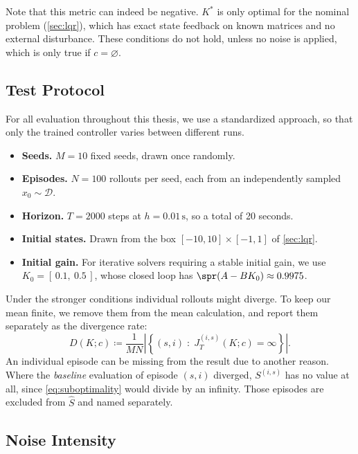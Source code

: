 Note that this metric can indeed be negative. $K^{*}$ is only optimal for
the nominal problem (\cref{sec:lqr}), which has exact state feedback on
known matrices and no external disturbance. These conditions do not
hold, unless no noise is applied, which is only true if $c=\varnothing$.

\subsection{Test Protocol}
\label{subsec:protocol}

For all evaluation throughout this thesis, we use a standardized
approach, so that only the trained controller varies between different runs.

\begin{itemize}
    \item \textbf{Seeds.} $M = 10$ fixed seeds, drawn once randomly.
    \item \textbf{Episodes.} $N = 100$ rollouts per seed, each from an
          independently sampled $x_0 \sim \mathcal{D}$.
    \item \textbf{Horizon.} $T = 2000$ steps at $h = 0.01\,\mathrm{s}$, so a total
            of 20 seconds.
    \item \textbf{Initial states.} Drawn from the box
          $[-10, 10] \times [-1, 1]$ of \cref{sec:lqr}.
    \item \textbf{Initial gain.} For iterative solvers requiring a
            stable initial gain, we use $K_0 = [\,0.1,\ 0.5\,]$,
            whose closed loop has $\spr(A - B K_0) \approx 0.9975$.
\end{itemize}

Under the stronger conditions individual rollouts might diverge. 
To keep our mean finite, we remove them from the mean calculation,
and report them separately as the divergence rate:
\begin{equation}
    \label{eq:divergence-rate}
    D(K; c) \coloneqq \frac{1}{M N}
    \left\lvert \left\{ (s, i) \;:\; J^{(i,s)}_T(K; c) = \infty \right\} \right\rvert .
\end{equation}
An individual episode can be missing from the result due to another reason. 
Where the \emph{baseline} evaluation of episode $(s,i)$ diverged,
$S^{(i,s)}$ has no value at all, since \eqref{eq:suboptimality} would divide 
by an infinity. Those episodes are excluded from $\hat{S}$ and named separately.

\subsection{Noise Intensity}
\label{subsec:noise-strength}

